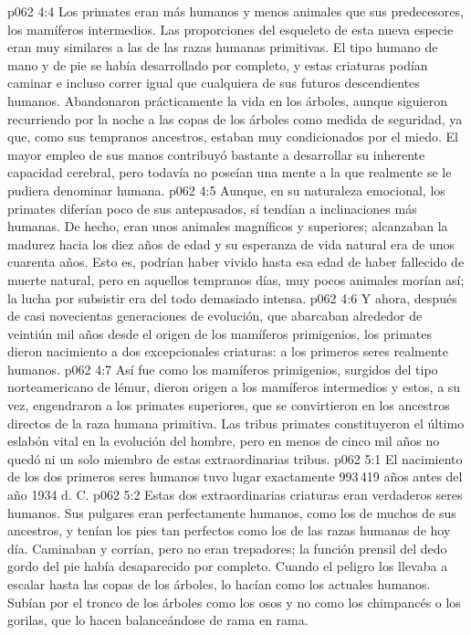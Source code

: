 \vs p062 4:4 \pc Los primates eran más humanos y menos animales que sus predecesores, los mamíferos intermedios. Las proporciones del esqueleto de esta nueva especie eran muy similares a las de las razas humanas primitivas. El tipo humano de mano y de pie se había desarrollado por completo, y estas criaturas podían caminar e incluso correr igual que cualquiera de sus futuros descendientes humanos. Abandonaron prácticamente la vida en los árboles, aunque siguieron recurriendo por la noche a las copas de los árboles como medida de seguridad, ya que, como sus tempranos ancestros, estaban muy condicionados por el miedo. El mayor empleo de sus manos contribuyó bastante a desarrollar su inherente capacidad cerebral, pero todavía no poseían una mente a la que realmente se le pudiera denominar humana.
\vs p062 4:5 Aunque, en su naturaleza emocional, los primates diferían poco de sus antepasados, sí tendían a inclinaciones más humanas. De hecho, eran unos animales magníficos y superiores; alcanzaban la madurez hacia los diez años de edad y su esperanza de vida natural era de unos cuarenta años. Esto es, podrían haber vivido hasta esa edad de haber fallecido de muerte natural, pero en aquellos tempranos días, muy pocos animales morían así; la lucha por subsistir era del todo demasiado intensa.
\vs p062 4:6 Y ahora, después de casi novecientas generaciones de evolución, que abarcaban alrededor de veintiún mil años desde el origen de los mamíferos primigenios, los primates dieron nacimiento  a dos excepcionales criaturas: a los primeros seres realmente humanos.
\vs p062 4:7 \pc Así fue como los mamíferos primigenios, surgidos del tipo norteamericano de lémur, dieron origen a los mamíferos intermedios y estos, a su vez, engendraron a los primates superiores, que se convirtieron en los ancestros directos de la raza humana primitiva. Las tribus primates constituyeron el último eslabón vital en la evolución del hombre, pero en menos de cinco mil años no quedó ni un solo miembro de estas extraordinarias tribus.
\vs p062 5:1 El nacimiento de los dos primeros seres humanos tuvo lugar exactamente 993\,419 años antes del año 1934 d. C.
\vs p062 5:2 Estas dos extraordinarias criaturas eran verdaderos seres humanos. Sus pulgares eran perfectamente humanos, como los de muchos de sus ancestros, y tenían los pies tan perfectos como los de las razas humanas de hoy día. Caminaban y corrían, pero no eran trepadores; la función prensil del dedo gordo del pie había desaparecido por completo. Cuando el peligro los llevaba a escalar hasta las copas de los árboles, lo hacían como los actuales humanos. Subían por el tronco de los árboles como los osos y no como los chimpancés o los gorilas, que lo hacen balanceándose de rama en rama.
